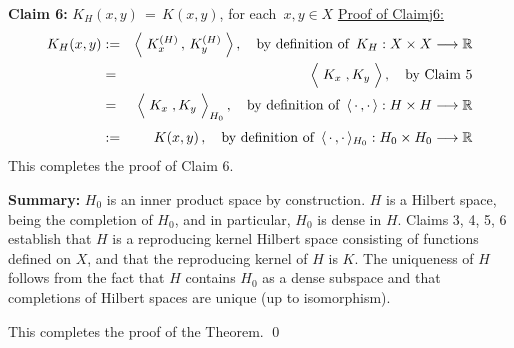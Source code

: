 \vskip 0.5cm
\noindent
\textbf{Claim 6:}\quad
$K_{H}(x,y) \, = \, K(x,y)$,\;
for each \,$x, y \in X$
\vskip 0.2cm
\noindent
\underline{Proof of Claim{\color{white}j}6:}
\begin{eqnarray*}
K_{H}(x,y)
& := &
	\left\langle\;
		K^{(H)}_{x} \,,\, K^{(H)}_{y}
		\;\right\rangle,
	\quad
	\textnormal{by definition of \,$K_{H} : X \times X \longrightarrow \Re$}
\\
& = &
	\left\langle\;
		\overset{{\color{white}.}}{K_{x}} \;, K_{y}
		\;\right\rangle,
	\quad
	\textnormal{by Claim 5}
\\
& = &
	\left\langle\;
		\overset{{\color{white}.}}{K_{x}} \;, K_{y}
		\;\right\rangle_{H_{0}},
	\quad
	\textnormal{by definition of \,$\langle\,\cdot\,,\cdot\,\rangle : H \times H \longrightarrow \Re$}
\\
& := &
	\overset{{\color{white}.}}{K(x,y)}\,,
	\quad
	\textnormal{by definition of \,$\langle\,\cdot\,,\cdot\,\rangle_{H_{0}} : H_{0} \times H_{0} \longrightarrow \Re$}
\end{eqnarray*}
This completes the proof of Claim 6.

\vskip 0.8cm
\noindent
\textbf{Summary:}
\vskip 0.1cm
\noindent
$H_{0}$ is an inner product space by construction.
$H$ is a Hilbert space, being the completion of $H_{0}$, and
in particular, $H_{0}$ is dense in $H$.
Claims 3, 4, 5, 6 establish that $H$ is a reproducing kernel Hilbert space
consisting of functions defined on $X$, and
that the reproducing kernel of $H$ is $K$.
The uniqueness of $H$ follows from the fact that $H$ contains
$H_{0}$ as a dense subspace and that completions of Hilbert spaces
are unique (up to isomorphism).

\vskip 0.3cm
\noindent
This completes the proof of the Theorem.
\qed


\renewcommand{\theenumi}{\roman{enumi}}
\renewcommand{\labelenumi}{\textnormal{(\theenumi)}$\;\;$}

